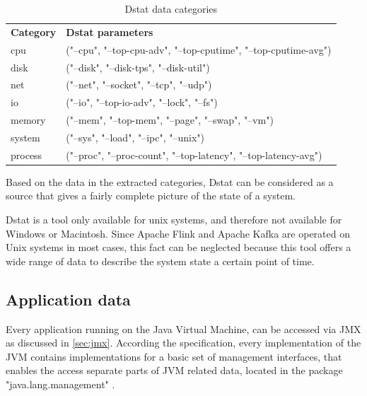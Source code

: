 \begin{table}[H]
    \begin{tabular}{ll}
        \textbf{Category} & \textbf{Dstat parameters} \\
        cpu & ("--cpu", "--top-cpu-adv", "--top-cputime", "--top-cputime-avg")\\
        disk & ("--disk", "--disk-tps", "--disk-util")\\
        net & ("--net", "--socket", "--tcp", "--udp")\\
        io & ("--io", "--top-io-adv", "--lock", "--fs")\\
        memory & ("--mem", "--top-mem", "--page", "--swap", "--vm")\\
        system & ("--sys", "--load", "--ipc", "--unix")\\
        process & ("--proc", "--proc-count", "--top-latency", "--top-latency-avg")\\
    \end{tabular}
    \caption{Dstat data categories}
    \label{tbl:dstatcategories}
\end{table}

Based on the data in the extracted categories, Dstat can be considered
as a source that gives a fairly complete picture of the state of a system.

Dstat is a tool only available for unix systems, and therefore not available for Windows or
Macintosh. Since Apache Flink and Apache Kafka are operated on Unix systems in most
cases, this fact can be neglected because this tool offers a wide range of data to describe
the system state a certain point of time.

\subsection{Application data}
\label{sec:application-data}
Every application running on the Java Virtual Machine, can be accessed via JMX as discussed
in \autoref{sec:jmx}. According the specification, every implementation of the JVM contains
implementations for a basic set of management interfaces, that enables the access separate parts of JVM related data,
located in the package "java.lang.management" \cite{Javadoc16}.

